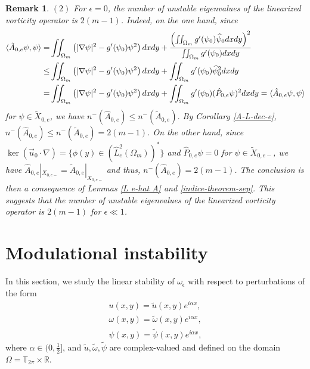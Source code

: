 \documentclass[1 [leqno, 11pt]{amsart}
\numberwithin{equation}{section}
\let\ep=\epsilon
\newtheorem{remark}[Theorem]{Remark}
\begin{document}
\begin{CJK*}{GBK}{song}
\begin{remark}
$(2)$
For $\ep=0$, the number of unstable eigenvalues of the linearized vorticity operator is $2(m-1)$. Indeed, on the one hand,
since
\begin{align*}
\langle\tilde A_{0,e}\psi,\psi\rangle=&\iint_{\Omega_m}\left(|\nabla\psi|^2-g'(\psi_0)\psi^2\right)dxdy+{\left(\iint_{\Omega_m}g'(\psi_0)\widehat\psi_0dxdy\right)^2\over \iint_{\Omega_m}g'(\psi_0)dxdy}\\
\leq &\iint_{\Omega_m}\left(|\nabla\psi|^2-g'(\psi_0)\psi^2\right)dxdy+{\iint_{\Omega_m}g'(\psi_0)\widehat\psi_0^2dxdy}\\
=&\iint_{\Omega_m}\left(|\nabla\psi|^2-g'(\psi_0)\psi^2\right)dxdy+{\iint_{\Omega_m}g'(\psi_0)(\hat P_{0,e}\psi)^2dxdy}=\langle\hat A_{0,e}\psi,\psi\rangle
 \end{align*}
 for $\psi\in\tilde X_{0,e}$, we have $n^-(\hat A_{0,e})\leq n^-(\tilde A_{0,e}).$
By Corollary \ref{A-L-dec-e}, $n^-\left(\hat{A}_{0,e}\right)\leq n^-\left(\tilde A_{0,e}\right)=2(m-1)$. On the other hand,
since $\ker(\vec{u}_0\cdot\nabla)=\{\phi(y)\in (\hat L_e^2(\Omega_m))^*\}$ and  $\hat{P}_{0,e}\psi=0$ for  $\psi\in\tilde X_{0,e-}$,
we have $\hat{A}_{0,e}|_{X_{0,e-}}=\tilde A_{0,e}|_{X_{0,e-}}$ and thus, $n^-\left(\hat{A}_{0,e}\right)=2(m-1)$. The conclusion is then a consequence of
Lemmas \ref{L e-hat A} and \ref{indice-theorem-sep}.
This  suggests that the number of unstable eigenvalues of the linearized vorticity operator is $2(m-1)$ for $\ep\ll1$.
\end{remark}
\section{Modulational instability}\label{modulational}
In this section, we study the linear stability of $\omega_\ep$ with respect to perturbations of the form
\begin{align}u(x, y) = \widetilde{u}(x, y)e^{i\alpha x},\nonumber\\
\omega(x, y) = \widetilde{\omega}(x, y)e^{i\alpha x},\label{perturbation-modulaitonal-form}\\
\psi(x, y) = \widetilde{\psi}(x, y)e^{i\alpha x},\nonumber\end{align}
where $\alpha \in (0, \frac 1 2]$, and $\widetilde{u}, \widetilde{\omega}, \widetilde{\psi}$ are complex-valued and defined on the domain $\Omega = \mathbb{T}_{2\pi} \times \mathbb{R}$.

\end{CJK*}
\end{document}
